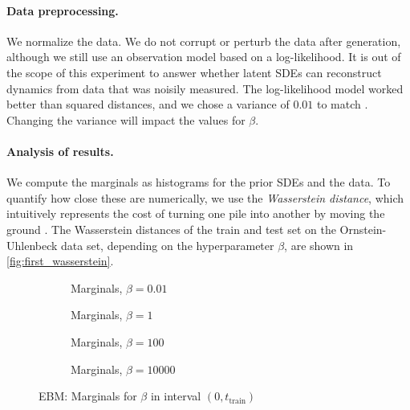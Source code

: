 \documentclass[twoside,11pt]{article}
\begin{document}
\paragraph{Data preprocessing.}
We normalize the data.
We do not corrupt or perturb the data after generation, although we still use an observation model based on a log-likelihood. It is out of the scope of this experiment to answer whether latent SDEs can reconstruct dynamics from data that was noisily measured. The log-likelihood model worked better than squared distances, and we chose a variance of \(0.01\) to match \citeauthor{li2020scalable} \citep{li2020scalable}. Changing the variance will impact the values for \(\beta\).

\paragraph{Analysis of results.}
We compute the marginals as histograms for the prior SDEs and the data. To quantify how close these are numerically, we use the \emph{Wasserstein distance}, which intuitively represents the cost of turning one pile into another by moving the ground \citep{panaretos2019statistical}. The Wasserstein distances of the train and test set on the Ornstein-Uhlenbeck data set, depending on the hyperparameter \(\beta\), are shown in \cref{fig:first_wasserstein}.


\begin{figure}
    \begin{subfigure}{.5\textwidth}
        \centering
        
        \caption{Marginals, \(\beta=0.01\)}
    \end{subfigure}
    \begin{subfigure}{.5\textwidth}
        \centering
        
        \caption{Marginals, \(\beta=1\)}
    \end{subfigure}
    \begin{subfigure}{.5\textwidth}
        \centering
        
        \caption{Marginals, \(\beta=100\)}
    \end{subfigure}
    \begin{subfigure}{.5\textwidth}
        \centering
        
        \caption{Marginals, \(\beta=10000\)}
    \end{subfigure}
    \caption{EBM: Marginals for \(\beta\) in interval \((0, t_{\text{train}})\)}
    \label{fig:first_marginals}
\end{figure}
\end{document}
